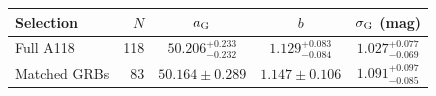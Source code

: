 \begin{tabular}{@{}lrccc@{}}
\toprule
Selection & \(N\) & \(a_{\rm G}\) & \(b\) & \(\sigma_{\rm G}\) (mag) \\
\midrule
Full A118 & 118 & $50.206^{+0.233}_{-0.232}$ & $1.129^{+0.083}_{-0.084}$ & $1.027^{+0.077}_{-0.069}$ \\
Matched GRBs & 83 & $50.164\pm0.289$ & $1.147\pm0.106$ & $1.091^{+0.097}_{-0.085}$ \\
\bottomrule
\end{tabular}
